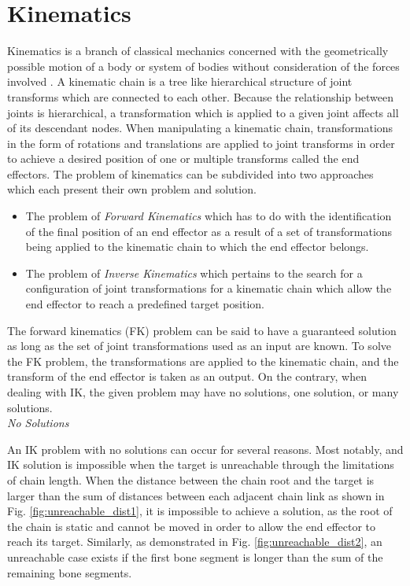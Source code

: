 \section{Kinematics}
Kinematics is a branch of classical mechanics concerned with the geometrically
possible motion of a body or system of bodies without consideration of the
forces involved \cite{kinematics_britannica}. A kinematic chain is a tree like
hierarchical structure of joint transforms which are connected to each other.
Because the relationship between joints is hierarchical, a transformation which
is applied to a given joint affects all of its descendant nodes. When
manipulating a kinematic chain, transformations in the form of rotations and
translations are applied to joint transforms in order to achieve a desired
position of one or multiple transforms called the end effectors. The problem of
kinematics can be subdivided into two approaches which each present their own
problem and solution.

\begin{itemize}
    \item The problem of \textit{Forward Kinematics} which has to do with the
        identification of the final position of an end effector as a result of
        a set of transformations being applied to the kinematic chain to which
        the end effector belongs.
    \item The problem of \textit{Inverse Kinematics} which pertains to the
        search for a configuration of joint transformations for a kinematic
        chain which allow the end effector to reach a predefined target
        position.
\end{itemize}

The forward kinematics (FK) problem can be said to have a guaranteed solution as
long as the set of joint transformations used as an input are known. To solve
the FK problem, the transformations are applied to the kinematic chain, and the
transform of the end effector is taken as an output. On the contrary, when
dealing with IK, the given problem may have no solutions, one solution, or many
solutions. \\

\noindent\textit{No Solutions}

An IK problem with no solutions can occur for several reasons. Most notably, and
IK solution is impossible when the target is unreachable through the limitations
of chain length. When the distance between the chain root and the target is
larger than the sum of distances between each adjacent chain link as shown in Fig.
\ref{fig:unreachable_dist1}, it is impossible to achieve a solution, as the
root of the chain is static and cannot be moved in order to allow the end
effector to reach its target. Similarly, as demonstrated in Fig.
\ref{fig:unreachable_dist2}, an unreachable case exists if the first bone
segment is longer than the sum of the remaining bone segments.

